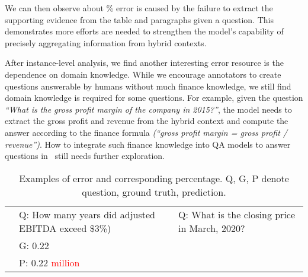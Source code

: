 We can then observe about \% error is caused by the failure to extract the supporting evidence from the table and paragraphs given a question.
This demonstrates more efforts are needed to strengthen the model's capability of precisely aggregating information from hybrid contexts.


After instance-level analysis, we find another interesting error resource is the dependence on domain knowledge. 
While we encourage annotators to create questions answerable by humans without much finance knowledge, we still find domain knowledge is required for some questions.
For example, given the question \emph{``What is the gross profit margin of the company in 2015?''},  the model needs to extract the gross profit and revenue from the hybrid context and compute the answer according to the finance formula \emph{(``gross profit margin = gross profit / revenue'')}. 
How to integrate such finance knowledge into QA models to answer questions in \finqa~still needs further exploration.

\begin{table}[h]
\centering
\footnotesize
\begin{tabular}{L{1.6cm}|L{5.2cm}}
\toprule
{} &  Q: How many years did adjusted EBITDA exceed \$3\%)} } & Q: What is the closing price in March, 2020? \\
& G: 0.22 \\
& P: 0.22 \textcolor{red}{million} \\
\bottomrule
\end{tabular} 
\caption{Examples of error and corresponding percentage. 
Q, G, P denote question, ground truth, prediction.}
\label{tab:error-case} 
\end{table}



